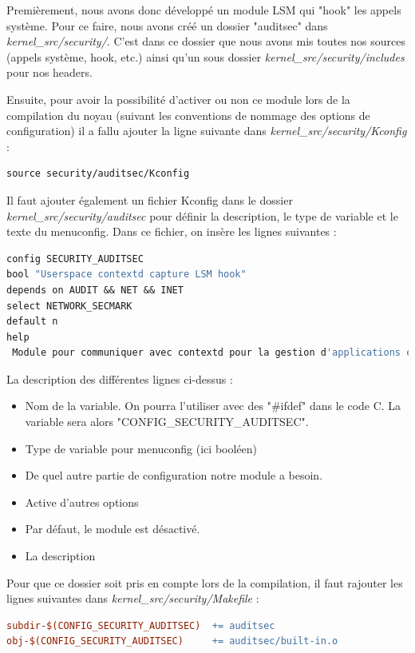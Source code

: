 \documentclass[pdftex,a4paper,titlepage,11pt]{article}
\begin{document}
Premièrement, nous avons donc développé un module LSM qui "hook" les appels système. Pour ce faire, nous avons créé un dossier "auditsec" dans \textit{{kernel\_src}/security/}. C'est dans ce dossier que nous avons mis toutes nos sources (appels système, hook, etc.) ainsi qu'un sous dossier \textit{{kernel\_src}/security/includes} pour nos headers.

Ensuite,  pour avoir la possibilité d'activer ou non ce module lors de la compilation du noyau (suivant les conventions de nommage des options de configuration) il a fallu ajouter la ligne suivante dans \textit{{kernel\_src}/security/Kconfig} :


\begin{lstlisting}[language=make]
source security/auditsec/Kconfig
\end{lstlisting}

Il faut ajouter également un fichier Kconfig dans le dossier \textit{{kernel\_src}/security/auditsec} pour définir la description, le type de variable et le texte du menuconfig. Dans ce fichier, on insère les lignes suivantes :

\begin{lstlisting}[language=make]
config SECURITY_AUDITSEC
bool "Userspace contextd capture LSM hook"
depends on AUDIT && NET && INET
select NETWORK_SECMARK
default n
help
 Module pour communiquer avec contextd pour la gestion d'applications en userspace.
\end{lstlisting}

La description des différentes lignes ci-dessus :
\begin{itemize}
	\item Nom de la variable. On pourra l'utiliser avec des "\#ifdef" dans le code C. La variable sera alors "CONFIG\_SECURITY\_AUDITSEC".
	\item Type de variable pour menuconfig (ici booléen)
	\item De quel autre partie de configuration notre module a besoin.
	\item Active d'autres options
	\item Par défaut, le module est désactivé.
	\item La description
\end{itemize}

 Pour que ce dossier soit pris en compte lors de la compilation, il faut rajouter les lignes suivantes dans \textit{{kernel\_src}/security/Makefile} :

\begin{lstlisting}[language=make]
subdir-$(CONFIG_SECURITY_AUDITSEC)  += auditsec	
obj-$(CONFIG_SECURITY_AUDITSEC)     += auditsec/built-in.o
\end{lstlisting}
\end{document}
